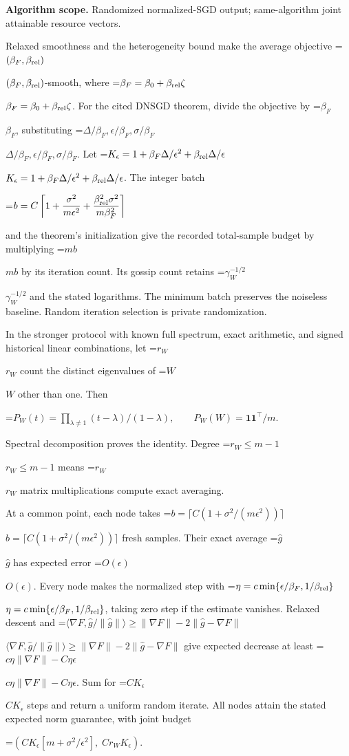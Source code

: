 \documentclass[10pt,a4paper]{article}
\newcommand{\AtlasMath}[1]{\par\begingroup\centering\setbox0=\hbox{$\displaystyle #1$}\ifdim\wd0>1.4\linewidth\typeout{ATLAS WIDE FORMULA: \the\wd0}\fi\ifdim\wd0>\linewidth\resizebox{\linewidth}{!}{\box0}\else\box0\fi\par\endgroup}
\newcommand{\AtlasInlineMath}[1]{\begingroup\setbox0=\hbox{$#1$}\ifdim\wd0>.4\linewidth\endgroup\AtlasMath{#1}\else\endgroup$#1$\fi}
\begin{document}
\textbf{Algorithm scope.} Randomized normalized-SGD output; same-algorithm joint attainable resource vectors.

Relaxed smoothness and the heterogeneity bound make the average objective \AtlasInlineMath{(\beta_F,\beta_{\rm rel})}-smooth, where \AtlasInlineMath{\beta_F=\beta_0+\beta_{\rm rel}\zeta}. For the cited DNSGD theorem, divide the objective by \AtlasInlineMath{\beta_F}, substituting \AtlasInlineMath{\Delta/\beta_F,\epsilon/\beta_F,\sigma/\beta_F}. Let
\AtlasInlineMath{K_\epsilon=1+\beta_F\Delta/\epsilon^2+\beta_{\rm rel}\Delta/\epsilon}.
The integer batch

\AtlasMath{b=C\left\lceil1+{\sigma^2\over m\epsilon^2}
+{\beta_{\rm rel}^2\sigma^2\over m\beta_F^2}\right\rceil}

and the theorem's initialization give the recorded total-sample budget by multiplying \AtlasInlineMath{mb} by its iteration count. Its gossip count retains \AtlasInlineMath{\gamma_W^{-1/2}} and the stated logarithms. The minimum batch preserves the noiseless baseline. Random iteration selection is private randomization.

In the stronger protocol with known full spectrum, exact arithmetic, and signed historical linear combinations, let \AtlasInlineMath{r_W} count the distinct eigenvalues of \AtlasInlineMath{W} other than one. Then

\AtlasMath{P_W(t)=\prod_{\lambda\ne1}(t-\lambda)/(1-\lambda),\qquad
P_W(W)=\mathbf1\mathbf1^\top/m.}

Spectral decomposition proves the identity. Degree \AtlasInlineMath{r_W\le m-1} means \AtlasInlineMath{r_W} matrix multiplications compute exact averaging.

At a common point, each node takes
\AtlasInlineMath{b=\lceil C(1+\sigma^2/(m\epsilon^2))\rceil} fresh samples. Their exact average \AtlasInlineMath{\widehat g} has expected error \AtlasInlineMath{O(\epsilon)}. Every node makes the normalized step with
\AtlasInlineMath{\eta=c\min\{\epsilon/\beta_F,1/\beta_{\rm rel}\}}, taking zero step if the estimate vanishes. Relaxed descent and
\AtlasInlineMath{\langle\nabla F,\widehat g/\|\widehat g\|\rangle
\ge\|\nabla F\|-2\|\widehat g-\nabla F\|}
give expected decrease at least \AtlasInlineMath{c\eta\|\nabla F\|-C\eta\epsilon}.
Sum for \AtlasInlineMath{CK_\epsilon} steps and return a uniform random iterate. All nodes attain the stated expected norm guarantee, with joint budget

\AtlasMath{(CK_\epsilon[m+\sigma^2/\epsilon^2],\;Cr_WK_\epsilon).}
\end{document}
